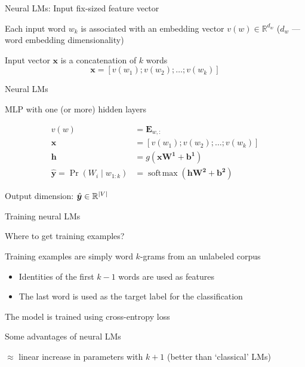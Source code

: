 \documentclass[12pt,aspectratio=169,handout]{beamer}
\DeclareMathOperator*{\softmax}{soft\!\max}
\begin{document}
\begin{frame}{Neural LMs: Input fix-sized feature vector}
	

Each input word $w_k$ is associated with an embedding vector $v(w) \in \mathbb{R}^{d_w}$ ($d_w$ --- word embedding dimensionality)

Input vector $\bm{x}$ is a concatenation of $k$ words
$$
\bm{x} = \left[ v(w_1); v(w_2); \ldots; v(w_k) \right]
$$
	
\end{frame}

\begin{frame}{Neural LMs}
	
	MLP with one (or more) hidden layers
	
	$$
	\begin{aligned}
		v(w) &= \bm{E}_{w,:} \\
		\bm{x} &= \left[ v(w_1); v(w_2); \ldots; v(w_k) \right] \\
		\bm{h} &= g(\bm{x} \bm{W^1} + \bm{b^1}) \\
		\hat{\bm{y}} = \Pr(W_i \mid w_{1:k}) &= \softmax (\bm{h} \bm{W^2} + \bm{b^2})
	\end{aligned}
	$$
	
	Output dimension: $\hat{\bm{y}} \in \mathbb{R}^{\abs{V}}$
	
\end{frame}

\begin{frame}{Training neural LMs}
	
	Where to get training examples?
	
	Training examples are simply word $k$-grams from an unlabeled corpus
	\begin{itemize}
		\item Identities of the first $k - 1$ words are used as features
		\item The last word is used as the target label for the classification
	\end{itemize}
	
	The model is trained using cross-entropy loss
\end{frame}

\begin{frame}{Some advantages of neural LMs}
	
$\approx$ linear increase in parameters with $k + 1$ (better than `classical' LMs)
	
\end{frame}
\end{document}
